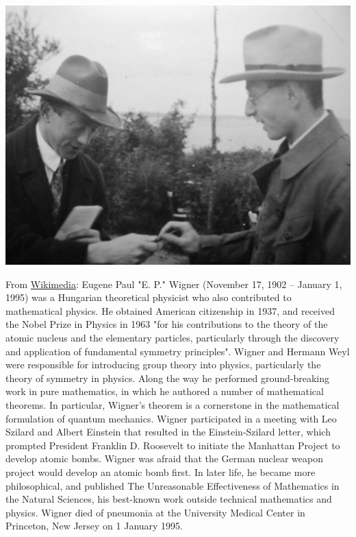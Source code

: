\documentclass[../main.tex]{subfiles}
\begin{document}
\begin{marginfigure}[+20mm]
	\includegraphics[width=1\linewidth]{images/Heisenberg,W._Wigner,E._1928.jpg}
	\caption[Werner Heisenberg and Eugene Wigner (1928).]{From \href{https://commons.wikimedia.org/wiki/File:Heisenberg,W._Wigner,E._1928.jpg}{Wikimedia}: Eugene Paul "E. P." Wigner (November 17, 1902 – January 1, 1995) was a Hungarian theoretical physicist who also contributed to mathematical physics. He obtained American citizenship in 1937, and received the Nobel Prize in Physics in 1963 "for his contributions to the theory of the atomic nucleus and the elementary particles, particularly through the discovery and application of fundamental symmetry principles". Wigner and Hermann Weyl were responsible for introducing group theory into physics, particularly the theory of symmetry in physics. Along the way he performed ground-breaking work in pure mathematics, in which he authored a number of mathematical theorems. In particular, Wigner's theorem is a cornerstone in the mathematical formulation of quantum mechanics. Wigner participated in a meeting with Leo Szilard and Albert Einstein that resulted in the Einstein-Szilard letter, which prompted President Franklin D. Roosevelt to initiate the Manhattan Project to develop atomic bombs. Wigner was afraid that the German nuclear weapon project would develop an atomic bomb first. In later life, he became more philosophical, and published The Unreasonable Effectiveness of Mathematics in the Natural Sciences, his best-known work outside technical mathematics and physics. Wigner died of pneumonia at the University Medical Center in Princeton, New Jersey on 1 January 1995.}
\end{marginfigure}
\end{document}

